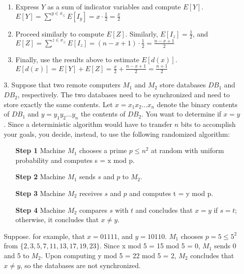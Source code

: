 \documentclass{article}       %
\begin{document}
\begin{enumerate}
\begin{enumerate}
		\item Express $Y$ as a sum of indicator variables and compute $E[Y]$.\newline\newline
		$E[Y] = \sum^{y \in x_{\leq}} E[I_y] = x \cdot \frac{1}{2} = \frac{x}{2}$\newline
		\item Proceed similarly to compute $E[Z]$.\newline\newline
		Similarly, $E[I_z] = \frac{1}{2}$, and $E[Z] = \sum^{z \in x_{\geq}} E[I_z] = (n-x+1) \cdot \frac{1}{2} = \frac{n-x+1}{2}$\newline
		\item Finally, use the results above to estimate $E[d(x)]$.\newline\newline
		$E[d(x)] = E[Y] + E[Z] = \frac{x}{2} + \frac{n-x+1}{2} = \frac{n+1}{2}$
	\end{enumerate}
	\item[3.] Suppose that two remote computers $M_1$ and $M_2$ store databases $DB_1$ and $DB_2$, respectively. The two databases need to be synchronized and need to store exactly the same contents. Let $x = x_1x_2 ... x_n$ denote the binary contents of $DB_1$ and $y = y_1y_2 ... y_n$ the contents of $DB_2$. You want to determine if $x = y$. Since a deterministic algorithm would have to transfer $n$ bits to accomplish your goals, you decide, instead, to use the following randomized algorithm:
	\begin{enumerate}
		\item[\textbf{Step 1}] Machine $M_1$ chooses a prime $p \leq n^2$ at random with uniform probability and computes s = x mod p.
		\item[\textbf{Step 2}] Machine $M_1$ sends $s$ and $p$ to $M_2$.
		\item[\textbf{Step 3}] Machine $M_2$ receives $s$ and $p$ and computes t = y mod p.
		\item[\textbf{Step 4}] Machine $M_2$ compares $s$ with $t$ and concludes that $x = y$ if $s = t$; otherwise, it concludes that $x \neq y$.
	\end{enumerate}
	Suppose. for example, that $x = 01111$, and $y = 10110$. $M_1$ chooses $p = 5 \leq 5^2$ from $\{2,3,5,7,11,13,17,19,23\}$. Since x mod 5 = 15 mod 5 = 0, $M_1$ sends 0 and 5 to $M_2$. Upon computing y mod 5 = 22 mod 5 = 2, $M_2$ concludes that $x \neq y$, so the databases are not synchronized.
	\begin{enumerate}

\end{enumerate}
\end{enumerate}
\end{document}
